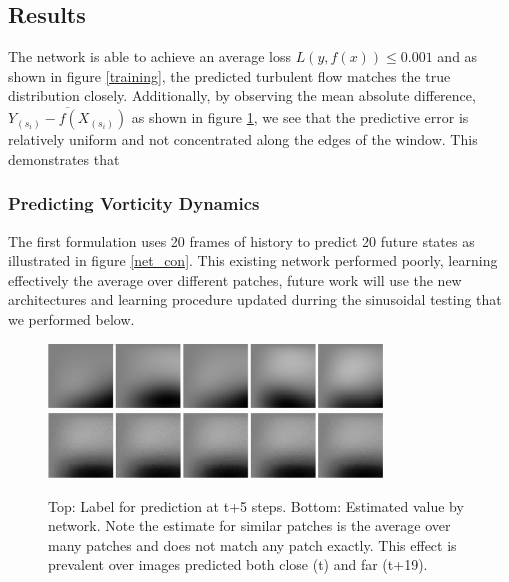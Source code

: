 \documentclass[10pt,letterpaper]{article}
\begin{document}
\subsection{Results}
 The network is able to achieve an average loss $L(y, f(x)) \leq 0.001$ and as shown in figure \ref{training}, the predicted turbulent flow matches the true distribution closely. Additionally, by observing the mean absolute difference, $\overline{Y_{(s_i)} - f(X_{(s_i)})}$ as shown in figure \ref{mean_error}, we see that the predictive error is relatively uniform and not concentrated along the edges of the window. This demonstrates that 

\subsubsection{Predicting Vorticity Dynamics}
The first formulation uses 20 frames of history to predict 20 future states as illustrated in figure \ref{net_con}. This existing network performed poorly, learning effectively the average over different patches, future work will use the new architectures and learning procedure updated durring the sinusoidal testing that we performed below.

\begin{figure}
	\begin{center}
		\includegraphics[width=0.79\textwidth]{images/avg_perf_lab.png}
		\includegraphics[width=0.79\textwidth]{images/avg_perf.png}
		\caption{\small Top: Label for prediction at t+5 steps. Bottom: Estimated value by network. Note the estimate for similar patches is the average over many patches and does not match any patch exactly. This effect is prevalent over images predicted both close (t) and far (t+19).}
		\label{mean_error}
	\end{center}	
\end{figure}
\end{document}
